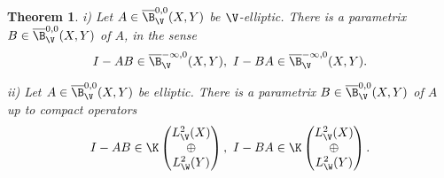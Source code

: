 \documentclass[10pt, reqno]{amsart}
\newtheorem{Thm}{Theorem}[section]
\theoremstyle{definition}
\begin{document}
\begin{Thm}
\emph{i)} Let $A \in \overline{\B}_{\V}^{0,0}(X, Y)$ be $\V$-elliptic. There is a parametrix $B \in \overline{\B}_{\V}^{0,0}(X, Y)$ of $A$, in the sense
\[
I - AB \in \overline{\B}_{\V}^{-\infty, 0}(X, Y), \ I - BA \in \overline{\B}_{\V}^{-\infty, 0}(X, Y). 
\]

\emph{ii)} Let $A \in \overline{\B}_{\V}^{0,0}(X, Y)$ be elliptic. There is a parametrix $B \in \overline{\B}_{\V}^{0,0}(X, Y)$ of $A$ up to 
compact operators
\[
I - AB \in \K\begin{pmatrix} L_{\V}^2(X) \\ \oplus \\ L_{\W}^2(Y) \end{pmatrix}, \ I - BA \in \K\begin{pmatrix} L_{\V}^2(X) \\ \oplus \\ L_{\W}^2(Y) \end{pmatrix}. 
\]

\label{Thm:parametrix}
\end{Thm}
\end{document}
